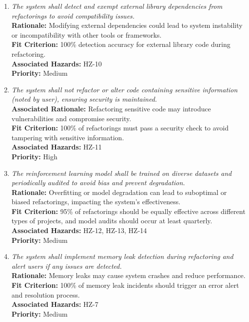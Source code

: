 \documentclass{article}
\begin{document}
\begin{enumerate}[label=SCR \arabic*., wide=0pt, leftmargin=*]
    \item \emph{The system shall detect and exempt external library dependencies from refactorings to avoid compatibility issues.}\\
    {\bf Rationale:} Modifying external dependencies could lead to system instability or incompatibility with other tools or frameworks.\\
    {\bf Fit Criterion:} 100\% detection accuracy for external library code during refactoring.\\
    {\bf Associated Hazards:} HZ-10\\
    {\bf Priority:} Medium

    \item \emph{The system shall not refactor or alter code containing sensitive information (noted by user), ensuring security is maintained.}\\
    {\bf Associated Rationale:} Refactoring sensitive code may introduce vulnerabilities and compromise security.\\
    {\bf Fit Criterion:} 100\% of refactorings must pass a security check to avoid tampering with sensitive information.\\
    {\bf Associated Hazards:} HZ-11\\
    {\bf Priority:} High

    \item \emph{The reinforcement learning model shall be trained on diverse datasets and periodically audited to avoid bias and prevent degradation.}\\
    {\bf Rationale:} Overfitting or model degradation can lead to suboptimal or biased refactorings, impacting the system's effectiveness.\\
    {\bf Fit Criterion:} 95\% of refactorings should be equally effective across different types of projects, and model audits should occur at least quarterly.\\
    {\bf Associated Hazards:} HZ-12, HZ-13, HZ-14\\
    {\bf Priority:} Medium

    \item \emph{The system shall implement memory leak detection during refactoring and alert users if any issues are detected.}\\
    {\bf Rationale:} Memory leaks may cause system crashes and reduce performance.\\
    {\bf Fit Criterion:} 100\% of memory leak incidents should trigger an error alert and resolution process.\\
    {\bf Associated Hazards:} HZ-7\\
    {\bf Priority:} Medium


\end{enumerate}
\end{document}
